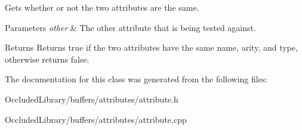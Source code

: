 Gets whether or not the two attributes are the same. 


\begin{DoxyParams}{Parameters}
{\em other} & The other attribute that is being tested against. \\
\hline
\end{DoxyParams}
\begin{DoxyReturn}{Returns}
Returns true if the two attributes have the same name, arity, and type, otherwise returns false. 
\end{DoxyReturn}


The documentation for this class was generated from the following files\+:\begin{DoxyCompactItemize}
\item 
Occluded\+Library/buffers/attributes/attribute.\+h\item 
Occluded\+Library/buffers/attributes/attribute.\+cpp\end{DoxyCompactItemize}
